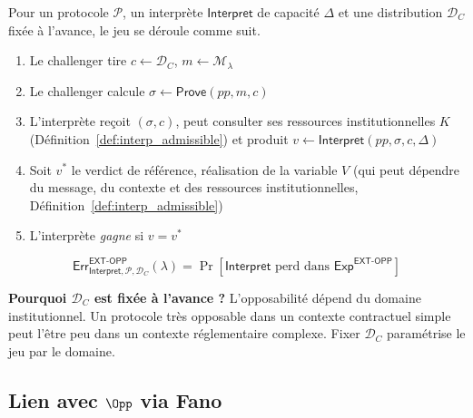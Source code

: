 \begin{sloppypar}
\begin{definition}\label{def:ann_ext_opp}
Pour un protocole $\mathcal{P}$, un interprète $\mathsf{Interpret}$
de capacité $\Delta$ et une distribution $\mathcal{D}_C$ fixée à l'avance, le jeu se d\'eroule comme suit.
\begin{enumerate}
\item Le challenger tire $c \leftarrow \mathcal{D}_C$,
      $m \leftarrow \mathcal{M}_\lambda$
\item Le challenger calcule $\sigma \leftarrow \mathsf{Prove}(pp,m,c)$
\item L'interprète reçoit $(\sigma,c)$, peut consulter ses ressources
      institutionnelles $K$ (D\'efinition~\ref{def:interp_admissible}) et produit
      $v \leftarrow \mathsf{Interpret}(pp,\sigma,c,\Delta)$
\item Soit $v^*$ le verdict de r\'ef\'erence, r\'ealisation de la variable $V$
      (qui peut d\'ependre du message, du contexte et des ressources
      institutionnelles, D\'efinition~\ref{def:interp_admissible})
\item L'interprète \emph{gagne} si $v = v^*$
\end{enumerate}
\begin{equation}
\mathsf{Err}^{\mathsf{EXT\text{-}OPP}}_{\mathsf{Interpret},\mathcal{P},\mathcal{D}_C}(\lambda)
= \Pr\!\left[
\mathsf{Interpret} \text{ perd dans }
\mathsf{Exp}^{\mathsf{EXT\text{-}OPP}}\right]
\end{equation}
\end{definition}

\noindent\textbf{Pourquoi $\mathcal{D}_C$ est fix\'ee \`a l'avance ?}
L'opposabilit\'e d\'epend du domaine institutionnel. Un protocole tr\`es
opposable dans un contexte contractuel simple peut l'\^etre peu dans un
contexte r\'eglementaire complexe. Fixer $\mathcal{D}_C$ param\'etrise le
jeu par le domaine.

\subsection{Lien avec $\Opp$ via Fano}


\end{sloppypar}
